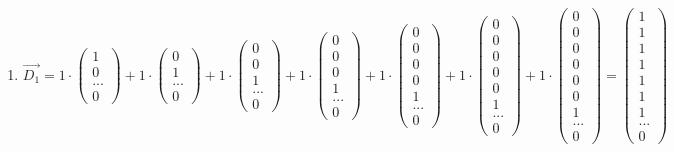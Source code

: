 \documentclass{WeSTassignment}
\begin{document}
\begin{enumerate}
\item $\vec{D_1} =  1 \cdot \begin{pmatrix} 1 \\ 0 \\ ... \\ 0 \end{pmatrix} + 1 \cdot  \begin{pmatrix} 0 \\ 1 \\ ... \\ 0 \end{pmatrix} + 1 \cdot \begin{pmatrix} 0 \\ 0 \\ 1 \\ ... \\ 0 \end{pmatrix} + 1 \cdot \begin{pmatrix} 0 \\ 0 \\ 0 \\ 1 \\ ... \\ 0 \end{pmatrix} + 1 \cdot \begin{pmatrix} 0  \\ 0 \\ 0 \\ 0 \\ 1 \\ ... \\ 0 \end{pmatrix} + 1 \cdot \begin{pmatrix} 0  \\ 0 \\ 0 \\ 0 \\ 0 \\ 1 \\ ... \\ 0 \end{pmatrix} + 1 \cdot \begin{pmatrix} 0 \\ 0 \\ 0 \\ 0 \\ 0 \\ 0 \\ 1 \\ ... \\ 0 \end{pmatrix} = \begin{pmatrix} 1  \\ 1 \\ 1 \\ 1 \\ 1 \\ 1 \\ 1 \\ ... \\ 0 \end{pmatrix}$ \\

\end{enumerate}
\end{document}
